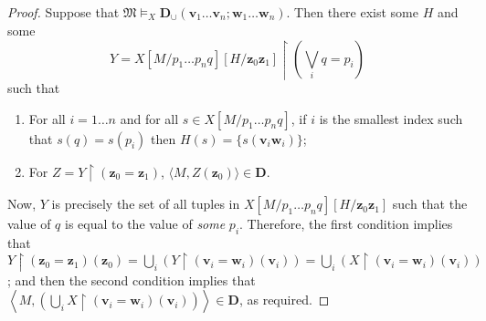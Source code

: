 \documentclass{article}
\theoremstyle{definition}
\newcommand{\tuple}{\mathbf}
\newcommand{\M}{\mathfrak M}
\newcommand{\D}{\mathbf D}
\begin{document}
\begin{proof}
	Suppose that $\M \models_X \D_\cup(\tuple v_1 \ldots \tuple v_n; \tuple w_1 \ldots \tuple w_n)$. Then there exist some $H$ and some
	\[
		Y = X[M/p_1 \ldots p_n q][H/\tuple z_0 \tuple z_1]\upharpoonright \left(\bigvee_i q = p_i\right)	\] 
such that
\begin{enumerate}
	\item For all $i = 1 \ldots n$ and for all $s \in X[M/p_1 \ldots p_n q]$, if $i$ is the smallest index such that $s(q) = s(p_i)$ then $H(s) = \{s(\tuple v_i \tuple w_i)\}$; 
	\item For $Z = Y \upharpoonright (\tuple z_0 = \tuple z_1)$, $\langle M,  Z(\tuple z_0)\rangle \in \D$. 
\end{enumerate}
	Now, $Y$ is precisely the set of all tuples in $X[M/p_1 \ldots p_n q][H/\tuple z_0 \tuple z_1]$ such that the value of $q$ is equal to the value of \emph{some} $p_i$. Therefore, the first condition implies that $Y\upharpoonright (\tuple z_0 = \tuple z_1)(\tuple z_0) = \bigcup_i (Y\upharpoonright (\tuple v_i = \tuple w_i)(\tuple v_i)) = \bigcup_i (X\upharpoonright (\tuple v_i = \tuple w_i)(\tuple v_i))$; and then the second condition implies that $\left \langle M, \left(\bigcup_i X\upharpoonright (\tuple v_i = \tuple w_i)(\tuple v_i)\right)\right\rangle \in \D$, as required.


\end{proof}
\end{document}
